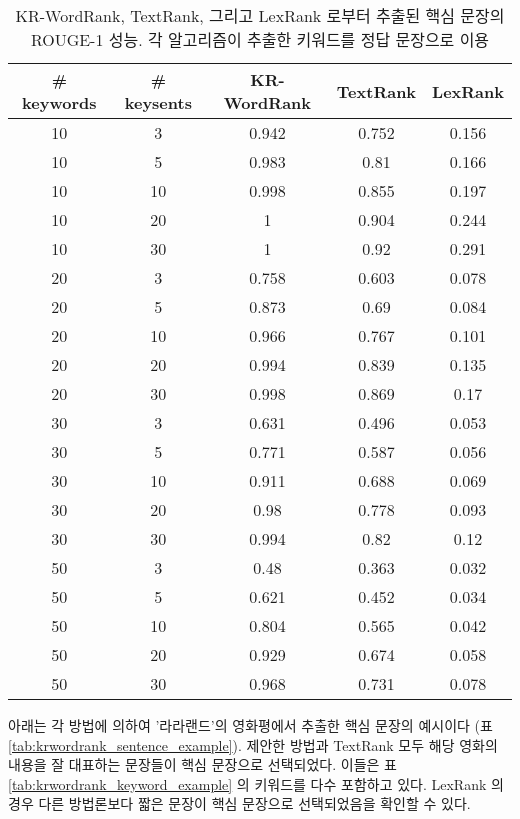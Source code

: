 \documentclass[oneside, ko,phd]{snuthesis_utf8_kor}
\begin{document}
\begin{table}[H]
\centering
\small
\caption{KR-WordRank, TextRank, 그리고 LexRank 로부터 추출된 핵심 문장의 ROUGE-1 성능. 각 알고리즘이 추출한 키워드를 정답 문장으로 이용}
\label{tab:krwordrank_sentence_performance}
\begin{tabular}{|c|c|c|c|c|}
\hline
\textbf{\# keywords} & \textbf{\# keysents} & \textbf{KR-WordRank} & \textbf{TextRank} & \textbf{LexRank} \\ \hline
10 & 3 & 0.942 & 0.752 & 0.156 \\ \hline
10 & 5 & 0.983 & 0.81 & 0.166 \\ \hline
10 & 10 & 0.998 & 0.855 & 0.197 \\ \hline
10 & 20 & 1 & 0.904 & 0.244 \\ \hline
10 & 30 & 1 & 0.92 & 0.291 \\ \hline
20 & 3 & 0.758 & 0.603 & 0.078 \\ \hline
20 & 5 & 0.873 & 0.69 & 0.084 \\ \hline
20 & 10 & 0.966 & 0.767 & 0.101 \\ \hline
20 & 20 & 0.994 & 0.839 & 0.135 \\ \hline
20 & 30 & 0.998 & 0.869 & 0.17 \\ \hline
30 & 3 & 0.631 & 0.496 & 0.053 \\ \hline
30 & 5 & 0.771 & 0.587 & 0.056 \\ \hline
30 & 10 & 0.911 & 0.688 & 0.069 \\ \hline
30 & 20 & 0.98 & 0.778 & 0.093 \\ \hline
30 & 30 & 0.994 & 0.82 & 0.12 \\ \hline
50 & 3 & 0.48 & 0.363 & 0.032 \\ \hline
50 & 5 & 0.621 & 0.452 & 0.034 \\ \hline
50 & 10 & 0.804 & 0.565 & 0.042 \\ \hline
50 & 20 & 0.929 & 0.674 & 0.058 \\ \hline
50 & 30 & 0.968 & 0.731 & 0.078 \\ \hline
\end{tabular}
\end{table}

아래는 각 방법에 의하여 '라라랜드'의 영화평에서 추출한 핵심 문장의 예시이다 (표 \ref{tab:krwordrank_sentence_example}).
제안한 방법과 TextRank 모두 해당 영화의 내용을 잘 대표하는 문장들이 핵심 문장으로 선택되었다.
이들은 표 \ref{tab:krwordrank_keyword_example} 의 키워드를 다수 포함하고 있다.
LexRank 의 경우 다른 방법론보다 짧은 문장이 핵심 문장으로 선택되었음을 확인할 수 있다.
\end{document}
